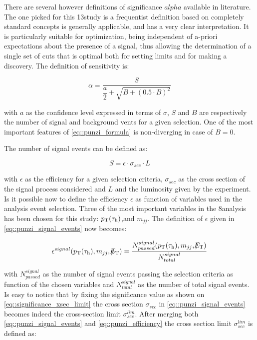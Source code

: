 There are several however definitions of significance $alpha$ available in literature. The one picked for this 13\tev study is a frequentist definition based on completely standard concepts\cite{Punzi:2003bu} is generally applicable, and has a very clear interpretation. It is particularly suitable for optimization, being independent of a-priori expectations about the presence of a signal, thus allowing the determination of a single set of cuts that is optimal both for setting limits and for making a discovery. The definition of sensitivity is:

\begin{equation}
\alpha = \dfrac{S}{\dfrac{a}{2} + \sqrt{B + (0.5 \cdot B)^{2}}}
\label{eq::punzi_formula}
\end{equation}

with $a$ as the confidence level expressed in terms of $\sigma$, $S$ and $B$ are respectively the number of signal and background vents for a given selection. One of the most important features of \autoref{eq::punzi_formula} is non-diverging in case of $B = 0$.

The number of signal events can be defined as:

\begin{equation}
S = \epsilon \cdot \sigma_{sec} \cdot L
\label{eq::punzi_signal_events}
\end{equation}

with $\epsilon$ as the efficiency for a given selection criteria, $\sigma_{sec}$ as the cross section of the signal process considered and $L$ and the luminosity given by the experiment. Is it possible now to define the efficiency $\epsilon$ as function of variables used in the analysis event selection. Three of the most important variables in the 8\tev analysis has been chosen for this study: $p_{\text{T}}(\tau_{\text{h}})$,\met and $m_{jj}$. The definition of $\epsilon$ given in \autoref{eq::punzi_signal_events} now becomes:

\begin{equation}
\epsilon^{signal} ( p_{\text{T}}(\tau_{\text{h}}) , m_{jj} ,  \slash\mkern-12mu{E}_{\text{T}} ) = \dfrac{N^{signal}_{passed}(p_{\text{T}}(\tau_{\text{h}}) , m_{jj} ,  \slash\mkern-12mu{E}_{\text{T}})}{N^{signal}_{total}}
\label{eq::punzi_efficiency}
\end{equation}

with $N^{signal}_{passed}$ as the number of signal events passing the selection criteria as function of the chosen variables and $N^{signal}_{total}$ as the number of total signal events. Is easy to notice that by fixing the significance value as shown on \autoref{eq::significance_xsec_limit} the cross section $\sigma_{sec}$ in \autoref{eq::punzi_signal_events} becomes indeed the cross-section limit $\sigma^{lim}_{sec}$. After merging both \autoref{eq::punzi_signal_events} and \autoref{eq::punzi_efficiency} the cross section limit $\sigma^{lim}_{sec}$ is defined as:
	
